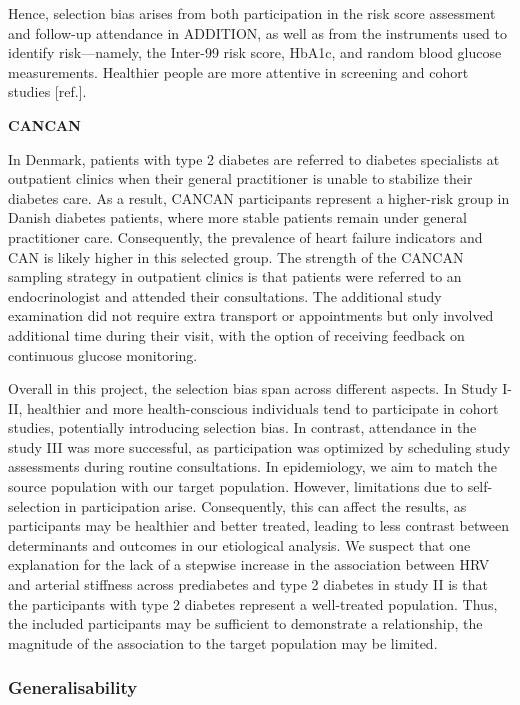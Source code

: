 \documentclass[
  a4paper,
  headsepline=true,
  open=any]{scrbook}
\begin{document}
Hence, selection bias arises from both participation in the risk score
assessment and follow-up attendance in ADDITION, as well as from the
instruments used to identify risk---namely, the Inter-99 risk score,
HbA1c, and random blood glucose measurements. Healthier people are more
attentive in screening and cohort studies {[}ref.{]}.

\textbf{CANCAN}

In Denmark, patients with type 2 diabetes are referred to diabetes
specialists at outpatient clinics when their general practitioner is
unable to stabilize their diabetes care. As a result, CANCAN
participants represent a higher-risk group in Danish diabetes patients,
where more stable patients remain under general practitioner care.
Consequently, the prevalence of heart failure indicators and CAN is
likely higher in this selected group. The strength of the CANCAN
sampling strategy in outpatient clinics is that patients were referred
to an endocrinologist and attended their consultations. The additional
study examination did not require extra transport or appointments but
only involved additional time during their visit, with the option of
receiving feedback on continuous glucose monitoring.

Overall in this project, the selection bias span across different
aspects. In Study I-II, healthier and more health-conscious individuals
tend to participate in cohort studies, potentially introducing selection
bias. In contrast, attendance in the study III was more successful, as
participation was optimized by scheduling study assessments during
routine consultations. In epidemiology, we aim to match the source
population with our target population. However, limitations due to
self-selection in participation arise. Consequently, this can affect the
results, as participants may be healthier and better treated, leading to
less contrast between determinants and outcomes in our etiological
analysis. We suspect that one explanation for the lack of a stepwise
increase in the association between HRV and arterial stiffness across
prediabetes and type 2 diabetes in study II is that the participants
with type 2 diabetes represent a well-treated population. Thus, the
included participants may be sufficient to demonstrate a relationship,
the magnitude of the association to the target population may be
limited.

\hypertarget{generalisability}{%
\subsubsection{Generalisability}\label{generalisability}}
\end{document}
